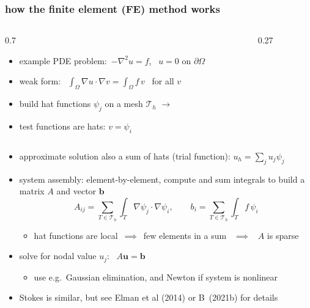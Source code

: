 \documentclass[10pt,
               hyperref={colorlinks,citecolor=DeepPink4,linkcolor=black,urlcolor=blue},
               svgnames]{beamer}
\newcommand{\grad}{\nabla}
\newcommand{\detailreturn}[1]{\hfill \hyperlink{#1}{\beamerreturnbutton{return}}}
\begin{document}
\begin{frame}[label=finiteelements]
\frametitle{how the finite element (FE) method works }

\begin{columns}
\begin{column}{0.7\textwidth}
\begin{itemize}
\setlength{\itemsep}{2mm}
\item example PDE problem: \,$-\grad^2 u = f$, \, $u=0$ on $\partial\Omega$
\item weak form: \, $\int_\Omega \grad u \cdot \grad v = \int_\Omega f\, v$ \, for all $v$
\item build \alert{hat functions} $\psi_j$ on a mesh $\mathcal{T}_h$ \qquad $\rightarrow$
\item \alert{test} functions are hats: $v=\psi_i$
\end{itemize}
\end{column}
\begin{column}{0.27\textwidth}
\vspace{5mm}


\end{column}
\end{columns}

\medskip
\begin{itemize}
\setlength{\itemsep}{2mm}
\item approximate solution also a sum of hats (\alert{trial} function): $u_h = \sum_j u_j \psi_j$
\item system \alert{assembly}: element-by-element, compute and sum integrals to build a matrix $A$ and vector $\mathbf{b}$
    $$A_{ij} = \sum_{T\in \mathcal{T}_h} \int_T \grad\psi_j \cdot \grad\psi_i, \qquad b_i = \sum_{T\in \mathcal{T}_h} \int_T f\,\psi_i$$

    \begin{itemize}
    \item[$\circ$] hat functions are local \,$\implies$\, few elements in a sum \, $\implies$ \, $A$ is sparse
    \end{itemize}
\item \alert{solve} for nodal value $u_j$: \, $A\mathbf{u} = \mathbf{b}$
    \begin{itemize}
    \item[$\circ$] use e.g.~Gaussian elimination, and Newton if system is nonlinear
    \end{itemize}

\item Stokes is similar, but see Elman et al (2014) or B~(2021b) for details
\end{itemize}

\detailreturn{mainfe}
\end{frame}
\end{document}
